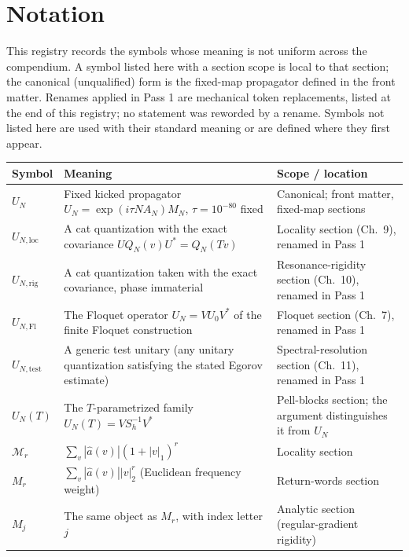\section*{Notation}\label{sec:notation}
This registry records the symbols whose meaning is not uniform across
the compendium. A symbol listed here with a section scope is local to
that section; the canonical (unqualified) form is the fixed-map
propagator defined in the front matter. Renames applied in Pass 1 are
mechanical token replacements, listed at the end of this registry; no
statement was reworded by a rename. Symbols not listed here are used
with their standard meaning or are defined where they first appear.

\begin{center}
\small
\begin{tabular}{>{\raggedright\arraybackslash}p{}>{\raggedright\arraybackslash}p{}>{\raggedright\arraybackslash}p{}}
Symbol & Meaning & Scope / location \\
\hline
\(U_N\) & Fixed kicked propagator \(U_N=\exp(i\tau N A_N)M_N\),
  \(\tau=10^{-80}\) fixed & Canonical; front matter, fixed-map sections \\
\(U_{N,\mathrm{loc}}\) & A cat quantization with the exact covariance
  \(UQ_N(v)U^*=Q_N(Tv)\) & Locality section (Ch.~9), renamed in Pass 1 \\
\(U_{N,\mathrm{rig}}\) & A cat quantization taken with the exact
  covariance, phase immaterial & Resonance-rigidity section (Ch.~10),
  renamed in Pass 1 \\
\(U_{N,\mathrm{Fl}}\) & The Floquet operator \(U_N=VU_0V^*\) of the
  finite Floquet construction & Floquet section (Ch.~7), renamed in Pass 1 \\
\(U_{N,\mathrm{test}}\) & A generic test unitary (any unitary
  quantization satisfying the stated Egorov estimate) &
  Spectral-resolution section (Ch.~11), renamed in Pass 1 \\
\(U_N(T)\) & The \(T\)-parametrized family \(U_N(T)=VS_h^{-1}V^*\) &
  Pell-blocks section; the argument distinguishes it from \(U_N\) \\
\(\mathcal{M}_r\) & \(\sum_v|\widehat a(v)|(1+|v|_1)^r\) &
  Locality section \\
\(M_r\) & \(\sum_v|\widehat a(v)||v|_2^r\) (Euclidean frequency weight) &
  Return-words section \\
\(M_j\) & The same object as \(M_r\), with index letter \(j\) &
  Analytic section (regular-gradient rigidity) \\

\end{tabular}
\end{center}
